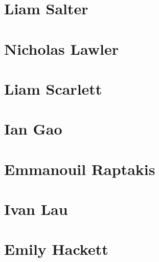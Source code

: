 \documentclass[11pt,a4paper]{report}
\begin{document}
\chapter{Liam Salter}


\chapter{Nicholas Lawler}


\chapter{Liam Scarlett}


\chapter{Ian Gao}


\chapter{Emmanouil Raptakis}


\chapter{Ivan Lau}


\chapter{Emily Hackett}

\end{document}
